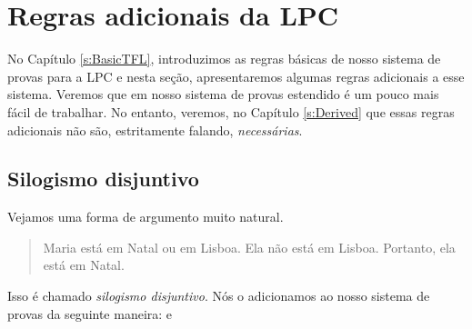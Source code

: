 
\chapter{Regras adicionais da LPC}\label{s:Further}
No Capítulo \ref{s:BasicTFL}, introduzimos as regras básicas de nosso sistema de provas para a LPC e nesta seção, apresentaremos algumas regras adicionais a esse sistema.  Veremos que em  nosso sistema de provas estendido é um pouco mais fácil de trabalhar.  No entanto, veremos, no Capítulo \ref{s:Derived} que essas regras adicionais não são, estritamente falando, \emph{necessárias}.


\section{Silogismo disjuntivo}
Vejamos uma forma de argumento muito natural.
	\begin{quote}
		Maria está em Natal ou em Lisboa. Ela não está em Lisboa. Portanto, ela está em Natal.
	\end{quote}
Isso é chamado  \emph{silogismo disjuntivo}. Nós o adicionamos ao nosso sistema de provas da seguinte maneira:
e

